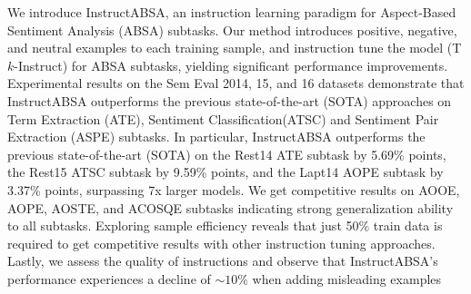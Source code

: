 We introduce InstructABSA, an instruction learning paradigm for Aspect-Based Sentiment Analysis (ABSA) subtasks. Our method introduces positive, negative, and neutral examples to each training sample, and instruction tune the model (T$k$-Instruct) for ABSA subtasks, yielding significant performance improvements. Experimental results on the Sem Eval 2014, 15, and 16 datasets demonstrate that InstructABSA outperforms the previous state-of-the-art (SOTA) approaches on Term Extraction (ATE), Sentiment Classification(ATSC) and Sentiment Pair Extraction (ASPE) subtasks. In particular, InstructABSA outperforms the previous state-of-the-art (SOTA) on the Rest14 ATE subtask by 5.69\% points, the Rest15 ATSC subtask by 9.59\% points, and the Lapt14 AOPE subtask by 3.37\% points, surpassing 7x larger models. We get competitive results on AOOE, AOPE, AOSTE, and ACOSQE subtasks indicating strong generalization ability to all subtasks.  Exploring sample efficiency reveals that just 50\% train data is required to get competitive results with other instruction tuning approaches.  Lastly, we assess the quality of instructions and observe that InstructABSA's performance experiences a decline of $\sim10\%$ when adding misleading examples